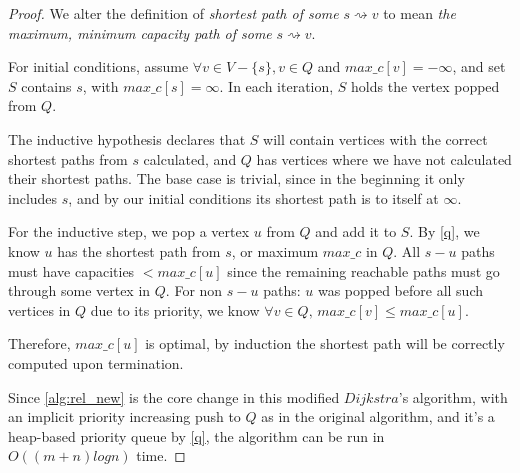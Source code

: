 \documentclass{article}
\begin{document}
\begin{proof}
We alter the definition of \textit{shortest path of some} $s \rightsquigarrow v$ to mean \textit{the maximum, minimum capacity path of some} $s \rightsquigarrow v$. 

For initial conditions, assume $\forall v \in V - \{s\}, v \in Q$ and $max\_c[v] = -\infty$, and set $S$ contains $s$, with $max\_c[s] = \infty$. In each iteration, $S$ holds the vertex popped from $Q$. 

The inductive hypothesis declares that $S$ will contain vertices with the correct shortest paths from $s$ calculated, and $Q$ has vertices where we have not calculated their shortest paths. The base case is trivial, since in the beginning it only includes $s$, and by our initial conditions its shortest path is to itself at $\infty$.

For the inductive step, we pop a vertex $u$ from $Q$ and add it to $S$. By \ref{q}, we know $u$ has the shortest path from $s$, or maximum $max\_c$ in $Q$. All $s-u$ paths must have capacities $< max\_c[u]$ since the remaining reachable paths must go through some vertex in $Q$. For non $s-u$ paths: $u$ was popped before all such vertices in $Q$ due to its priority, we know $\forall v \in Q, \, max\_c[v] \leq max\_c[u]$.

Therefore, $max\_c[u]$ is optimal, by induction the shortest path will be correctly computed upon termination.

Since \ref{alg:rel_new} is the core change in this modified $Dijkstra$'s algorithm, with an implicit priority increasing push to $Q$ as in the original algorithm, and it's a heap-based priority queue by \ref{q}, the algorithm can be run in $O((m+n)logn)$ time.

\end{proof}
 
\end{document}
